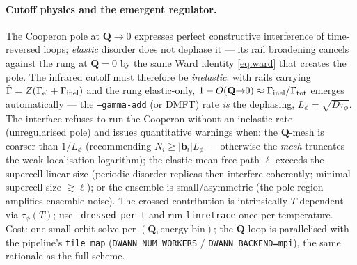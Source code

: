 \documentclass[11pt]{article}
\newcommand{\Gam}{\Gamma}
\begin{document}
\paragraph{Cutoff physics and the emergent regulator.}
The Cooperon pole at $\mathbf Q\to0$ expresses perfect constructive
interference of time-reversed loops; \emph{elastic} disorder does not
dephase it --- its rail broadening cancels against the rung at
$\mathbf Q=0$ by the same Ward identity \eqref{eq:ward} that creates the
pole.  The infrared cutoff must therefore be \emph{inelastic}: with
rails carrying $\tilde\Gam=Z(\Gam_{\rm el}+\Gam_{\rm inel})$ and the
rung elastic-only, $1-O(\mathbf Q{\to}0)\approx
\Gam_{\rm inel}/\Gam_{\rm tot}$ emerges automatically --- the
\texttt{--gamma-add} (or DMFT) rate \emph{is} the dephasing,
$L_\phi=\sqrt{D\tau_\phi}$.  The interface refuses to run the Cooperon
without an inelastic rate (unregularised pole) and issues quantitative
warnings when: the $\mathbf Q$-mesh is coarser than $1/L_\phi$
(recommending $N_i\ge|\mathbf b_i|L_\phi$ --- otherwise the \emph{mesh}
truncates the weak-localisation logarithm); the elastic mean free path
$\ell$ exceeds the supercell linear size (periodic disorder replicas
then interfere coherently; minimal supercell size $\gtrsim\ell$); or the
ensemble is small/asymmetric (the pole region amplifies ensemble
noise).  The crossed contribution is intrinsically $T$-dependent via
$\tau_\phi(T)$; use \texttt{--dressed-per-t} and run
\texttt{linretrace} once per temperature.  Cost: one small orbit solve
per $(\mathbf Q,\text{energy bin})$; the $\mathbf Q$ loop is
parallelised with the pipeline's \texttt{tile\_map}
(\texttt{DWANN\_NUM\_WORKERS} / \texttt{DWANN\_BACKEND=mpi}), the same
rationale as the full scheme.
\end{document}
